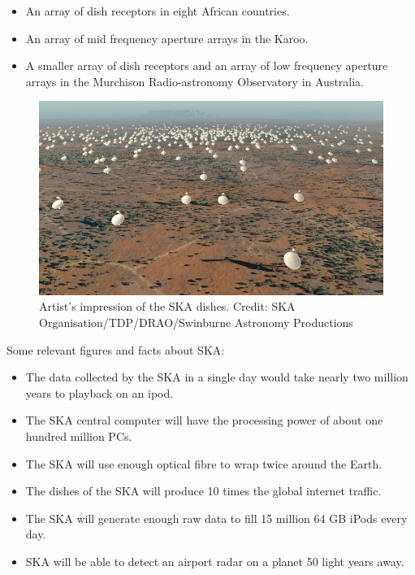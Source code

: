 \begin{itemize}
\item An array of dish receptors in eight African countries. 
\item An array of mid frequency aperture arrays in the Karoo. 
\item A smaller array of dish receptors and an array of low frequency aperture arrays in the Murchison Radio-astronomy Observatory in Australia.
\end{itemize}

 \begin{figure}[tb]
 \centering
 \includegraphics[width=\textwidth]{images/ska.jpg}
 \caption{Artist's impression of the SKA dishes. Credit: SKA Organisation/TDP/DRAO/Swinburne Astronomy Productions}
 \end{figure}


Some relevant figures and facts about SKA:

\begin{itemize}

\item The data collected by the SKA in a single day would take nearly two million years to playback on an ipod.
\item The SKA central computer will have the processing power of about one hundred million PCs.
\item The SKA will use enough optical fibre to wrap twice around the Earth.
\item The dishes of the SKA will produce 10 times the global internet traffic.
\item The SKA will generate enough raw data to fill 15 million 64 GB iPods every day.
\item SKA will be able to detect an airport radar on a planet 50 light years away.

\end{itemize}

